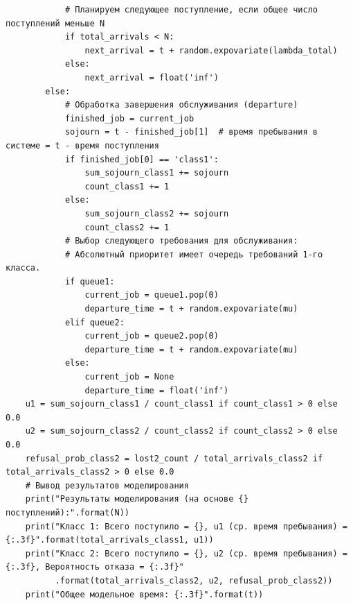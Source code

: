 \documentclass[otchet]{SCWorks}
\begin{document}
\begin{verbatim}
            # Планируем следующее поступление, если общее число поступлений меньше N
            if total_arrivals < N:
                next_arrival = t + random.expovariate(lambda_total)
            else:
                next_arrival = float('inf')
        else:
            # Обработка завершения обслуживания (departure)
            finished_job = current_job
            sojourn = t - finished_job[1]  # время пребывания в системе = t - время поступления
            if finished_job[0] == 'class1':
                sum_sojourn_class1 += sojourn
                count_class1 += 1
            else:
                sum_sojourn_class2 += sojourn
                count_class2 += 1
            # Выбор следующего требования для обслуживания:
            # Абсолютный приоритет имеет очередь требований 1-го класса.
            if queue1:
                current_job = queue1.pop(0)
                departure_time = t + random.expovariate(mu)
            elif queue2:
                current_job = queue2.pop(0)
                departure_time = t + random.expovariate(mu)
            else:
                current_job = None
                departure_time = float('inf')
    u1 = sum_sojourn_class1 / count_class1 if count_class1 > 0 else 0.0
    u2 = sum_sojourn_class2 / count_class2 if count_class2 > 0 else 0.0
    refusal_prob_class2 = lost2_count / total_arrivals_class2 if total_arrivals_class2 > 0 else 0.0
    # Вывод результатов моделирования
    print("Результаты моделирования (на основе {} поступлений):".format(N))
    print("Класс 1: Всего поступило = {}, u1 (ср. время пребывания) = {:.3f}".format(total_arrivals_class1, u1))
    print("Класс 2: Всего поступило = {}, u2 (ср. время пребывания) = {:.3f}, Вероятность отказа = {:.3f}"
          .format(total_arrivals_class2, u2, refusal_prob_class2))
    print("Общее модельное время: {:.3f}".format(t))    
\end{verbatim}
\end{document}
